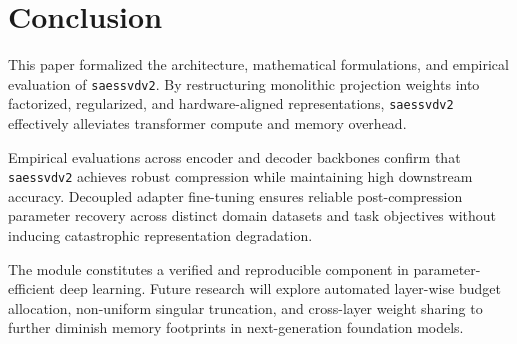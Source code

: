 \section{Conclusion}
This paper formalized the architecture, mathematical formulations, and empirical evaluation of \texttt{saessvdv2}. By restructuring monolithic projection weights into factorized, regularized, and hardware-aligned representations, \texttt{saessvdv2} effectively alleviates transformer compute and memory overhead.

Empirical evaluations across encoder and decoder backbones confirm that \texttt{saessvdv2} achieves robust compression while maintaining high downstream accuracy. Decoupled adapter fine-tuning ensures reliable post-compression parameter recovery across distinct domain datasets and task objectives without inducing catastrophic representation degradation.

The module constitutes a verified and reproducible component in parameter-efficient deep learning. Future research will explore automated layer-wise budget allocation, non-uniform singular truncation, and cross-layer weight sharing to further diminish memory footprints in next-generation foundation models.
